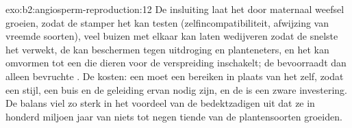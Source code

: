 \begin{solution}{exo:b2:angiosperm-reproduction:12}
De insluiting laat het  door maternaal weefsel groeien, zodat
de stamper het kan testen (zelfincompatibiliteit, afwijzing van vreemde
soorten), veel buizen met elkaar kan laten wedijveren zodat de snelste het
 verwekt, de  kan beschermen tegen uitdroging en
planteneters, en het  kan omvormen tot een  die dieren
voor de verspreiding inschakelt; de  bevoorraadt dan
alleen bevruchte . De kosten: een  moet een
 bereiken in plaats van het  zelf, zodat een stijl, een
buis en de geleiding ervan nodig zijn, en de  is een zware
investering. De balans viel zo sterk in het voordeel van de bedektzadigen
uit dat ze in honderd miljoen jaar van niets tot negen tiende van de
plantensoorten groeiden.
\end{solution}

